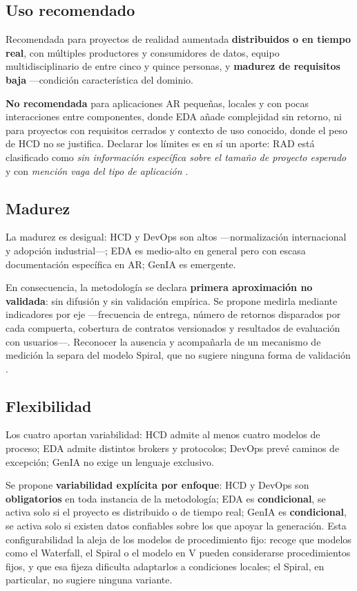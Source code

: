\documentclass[conference]{IEEEtran}
\begin{document}
\subsection{Uso recomendado}

Recomendada para proyectos de realidad aumentada \textbf{distribuidos o en tiempo real}, con múltiples productores y consumidores de datos, equipo multidisciplinario de entre cinco y quince personas, y \textbf{madurez de requisitos baja} —condición característica del dominio.

\textbf{No recomendada} para aplicaciones AR pequeñas, locales y con pocas interacciones entre componentes, donde EDA añade complejidad sin retorno, ni para proyectos con requisitos cerrados y contexto de uso conocido, donde el peso de HCD no se justifica. Declarar los límites es en sí un aporte: RAD está clasificado como \textit{sin información específica sobre el tamaño de proyecto esperado} y con \textit{mención vaga del tipo de aplicación} \cite{Ceret2013}.

\subsection{Madurez}

La madurez es desigual: HCD y DevOps son altos —normalización internacional y adopción industrial—; EDA es medio-alto en general pero con escasa documentación específica en AR; GenIA es emergente.

En consecuencia, la metodología se declara \textbf{primera aproximación no validada}: sin difusión y sin validación empírica. Se propone medirla mediante indicadores por eje —frecuencia de entrega, número de retornos disparados por cada compuerta, cobertura de contratos versionados y resultados de evaluación con usuarios—. Reconocer la ausencia y acompañarla de un mecanismo de medición la separa del modelo Spiral, que no sugiere ninguna forma de validación \cite{Ceret2013}.

\subsection{Flexibilidad}

Los cuatro aportan variabilidad: HCD admite al menos cuatro modelos de proceso; EDA admite distintos brokers y protocolos; DevOps prevé caminos de excepción; GenIA no exige un lenguaje exclusivo.

Se propone \textbf{variabilidad explícita por enfoque}: HCD y DevOps son \textbf{obligatorios} en toda instancia de la metodología; EDA es \textbf{condicional}, se activa solo si el proyecto es distribuido o de tiempo real; GenIA es \textbf{condicional}, se activa solo si existen datos confiables sobre los que apoyar la generación. Esta configurabilidad la aleja de los modelos de procedimiento fijo: \cite{Ceret2013} recoge que modelos como el Waterfall, el Spiral o el modelo en V pueden considerarse procedimientos fijos, y que esa fijeza dificulta adaptarlos a condiciones locales; el Spiral, en particular, no sugiere ninguna variante.
\end{document}
